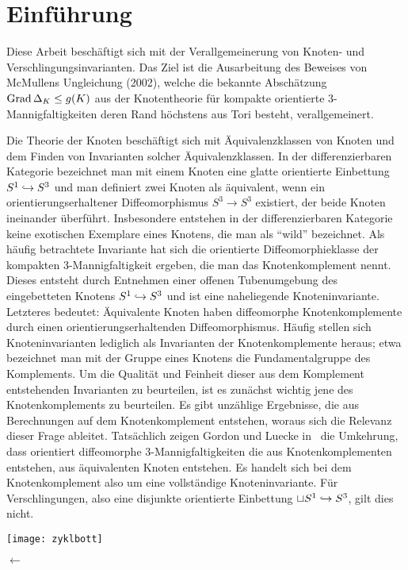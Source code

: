 \section{Einführung}
		
	\begin{minipage}[t][\textheight][t]{0.76\textwidth}

	Diese Arbeit beschäftigt sich mit der Verallgemeinerung von Knoten- und Verschlingungsinvarianten. Das Ziel ist die Ausarbeitung des Beweises von McMullens Ungleichung (2002), welche die bekannte Abschätzung $\operatorname{Grad} \Delta_K \leq g(K)$ aus der Knotentheorie für kompakte orientierte 3-Mannigfaltigkeiten deren Rand höchstens aus Tori besteht, verallgemeinert.

	Die Theorie der Knoten beschäftigt sich mit Äquivalenzklassen von Knoten und dem Finden von Invarianten solcher Äquivalenzklassen. In der differenzierbaren Kategorie bezeichnet man mit einem Knoten eine glatte orientierte Einbettung $S^1\hookrightarrow S^3$ und man definiert zwei Knoten als äquivalent, wenn ein orientierungserhaltener Diffeomorphismus $S^3\to S^3$ existiert, der beide Knoten ineinander überführt. Insbesondere entstehen in der differenzierbaren Kategorie keine exotischen Exemplare eines Knotens, die man als "`wild"' bezeichnet. Als häufig betrachtete Invariante hat sich die orientierte Diffeomorphieklasse der kompakten 3-Mannigfaltigkeit ergeben, die man das Knotenkomplement nennt. Dieses entsteht durch Entnehmen einer offenen Tubenumgebung des eingebetteten Knotens $S^1 \hookrightarrow S^3$ und ist eine naheliegende Knoteninvariante. Letzteres bedeutet: Äquivalente Knoten haben diffeomorphe Knotenkomplemente durch einen orientierungserhaltenden Diffeomorphismus. Häufig stellen sich Knoteninvarianten lediglich als Invarianten der Knotenkomplemente heraus; etwa bezeichnet man mit der Gruppe eines Knotens die Fundamentalgruppe des Komplements. Um die Qualität und Feinheit dieser aus dem Komplement entstehenden Invarianten zu beurteilen, ist es zunächst wichtig jene des Knotenkomplements zu beurteilen. Es gibt unzählige Ergebnisse, die aus Berechnungen auf dem Knotenkomplement entstehen, woraus sich die Relevanz dieser Frage ableitet. Tatsächlich zeigen Gordon und Luecke in~\cite[1989]{Gordon.1989} die Umkehrung, dass orientiert diffeomorphe 3-Mannigfaltigkeiten die aus Knotenkomplementen entstehen, aus äquivalenten Knoten entstehen. Es handelt sich bei dem Knotenkomplement also um eine vollständige Knoteninvariante. Für Verschlingungen, also eine disjunkte orientierte Einbettung $\sqcup S^1 \hookrightarrow S^3$, gilt dies nicht.

	
	\vfill
	\begin{minipage}[t]{0.7\textwidth}
		\texttt{[image: zyklbott]} 
	\end{minipage}
	\begin{minipage}[t]{0.2\textwidth}
	\vspace{-1cm}
	\huge$\longleftarrow$
	\vfill

	\end{minipage}
	\vspace{.63cm}
		 \label{fig:zykl}
	\end{minipage}
